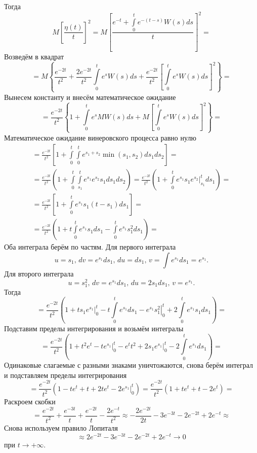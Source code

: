 Тогда
$$M \left[ \frac{ \eta \left( t \right) }{t} \right]^2 =
  M \left[
    \frac{e^{-t} + \int \limits_0^t e^{-\left( t - s \right) } W \left( s \right) ds}{t}
  \right]^2 =$$
Возведём в квадрат
$$= M \left\{
    \frac{e^{-2t}}{t^2} + \frac{2e^{-2t}}{t^2} \int \limits_0^t e^s W \left( s \right) ds +
    \frac{e^{-2t}}{t^2} \left[ \int \limits_0^t e^s W \left( s \right) ds \right]^2 \right\} =$$
Вынесем константу и внесём математическое ожидание
$$= \frac{e^{-2t}}{t^2} \left\{
    1 + \int \limits_0^t e^s MW \left( s \right) ds +
    M \left[ \int \limits_0^t e^s W \left( s \right) ds \right]^2 \right\} =$$
Математическое ожидание винеровского процесса равно нулю
\begin{gather*}
  = \frac{e^{-2t}}{t^2} \left[
    1 + \int \limits_0^t \int \limits_0^t e^{s_1 + s_2} \min \left( s_1, s_2 \right) ds_1 ds_2
  \right] = \\
  = \frac{e^{-2t}}{t^2} \left(
    1 + \int \limits_0^t \int \limits_{s_1}^t e^{s_1} e^{s_2} s_1 ds_1 ds_2 \right) =
  \frac{e^{-2t}}{t^2}
  \left( 1 + \int \limits_0^t e^{s_1} s_1 \left. e^{s_2} \right|_{s_1}^t ds_1 \right) = \\
  = \frac{e^{-2t}}{t^2}
  \left[ 1 + \int \limits_0^t e^{s_1} s_1 \left( t - s_1 \right) ds_1 \right] = \\
  = \frac{e^{-2t}}{t^2}
  \left( 1 + t \int \limits_0^t e^{s_1} s_1 ds_1 - \int \limits_0^t e^{s_1} s_1^2 ds_1 \right) =
\end{gather*}
Оба интеграла берём по частям.
Для первого интеграла
$$u = s_1, \,
  dv = e^{s_1} ds_1, \,
  du = ds_1, \,
  v = \int \limits e^{s_1} ds_1 = e^{s_1}.$$
Для второго интеграла
$$u = s_1^2, \,
  dv = e^{s_1} ds_1, \,
  du = 2s_1 ds_1, \,
  v = e^{s_1}.$$
Тогда
$$= \frac{e^{-2t}}{t^2} \left(
    1 + \left. ts_1 e^{s_1} \right|_0^t - t \int \limits_0^t e^{s_1} ds_1 -
    \left. e^{s_1} s_1^2 \right|_0^t + 2 \int \limits_0^t e^{s_1} s_1 ds_1 \right) =$$
Подставим пределы интегрирования и возьмём интегралы
$$= \frac{e^{-2t}}{t^2} \left(
    1 + t^2 e^t - \left. te^{s_1} \right|_0^t - e^t t^2 + 2 \left. s_1 e^{s_1} \right|_0^t -
    2 \int \limits_0^t e^{s_1} ds_1 \right) =$$
Одинаковые слагаемые с разными знаками уничтожаются,
снова берём интеграл и подставляем пределы интегрирования
$$= \frac{e^{-2t}}{t^2} \left( 1 - te^t + t + 2te^t - 2 \left. e^{s_1} \right|_0^t \right) =
  \frac{e^{-2t}}{t^2} \left( 1 + te^t + t - 2e^t \right) =$$
Раскроем скобки
$$= \frac{e^{-2t}}{t^2} + \frac{e^{-3t}}{t} + \frac{e^{-2t}}{t} - \frac{2e^{-t}}{t^2} \approx
  -\frac{2e^{-2t}}{2t} - 3e^{-3t} - 2e^{-2t} + 2e^{-t} \approx$$
Снова используем правило Лопиталя
$$ \approx 2e^{-2t} - 3e^{-3t} - 2e^{-2t} + 2e^{-t} \to 0$$
при $t \to +\infty$.
